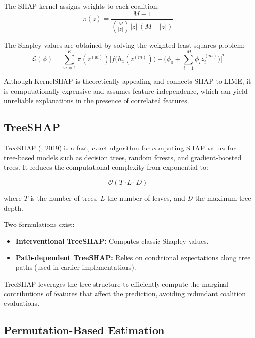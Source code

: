 The SHAP kernel assigns weights to each coalition:
\begin{equation}
\pi(z) = \frac{M - 1}{\binom{M}{|z|} \, |z| \, (M - |z|)}
\end{equation}

The Shapley values are obtained by solving the weighted least-squares problem:
\begin{equation}
\mathcal{L}(\phi) =
\sum_{m=1}^{K} \pi(z^{(m)})
\Big[
f\!\big(h_x(z^{(m)})\big)
- \big( \phi_0 + \sum_{i=1}^{M} \phi_i z^{(m)}_i \big)
\Big]^2
\end{equation}

Although KernelSHAP is theoretically appealing and connects SHAP to LIME, it is computationally expensive and assumes feature independence, which can yield unreliable explanations in the presence of correlated features.

\subsection{TreeSHAP}

TreeSHAP (\citeauthor{Lundberg2019TreeSHAP}, 2019) is a fast, exact algorithm for computing SHAP values for tree-based models such as decision trees, random forests, and gradient-boosted trees.  
It reduces the computational complexity from exponential to:

\begin{equation}
\mathcal{O}(T \cdot L \cdot D)
\end{equation}

where $T$ is the number of trees, $L$ the number of leaves, and $D$ the maximum tree depth.

Two formulations exist:
\begin{itemize}
    \item \textbf{Interventional TreeSHAP:} Computes classic Shapley values.
    \item \textbf{Path-dependent TreeSHAP:} Relies on conditional expectations along tree paths (used in earlier implementations).
\end{itemize}

TreeSHAP leverages the tree structure to efficiently compute the marginal contributions of features that affect the prediction, avoiding redundant coalition evaluations.

\subsection{Permutation-Based Estimation}

